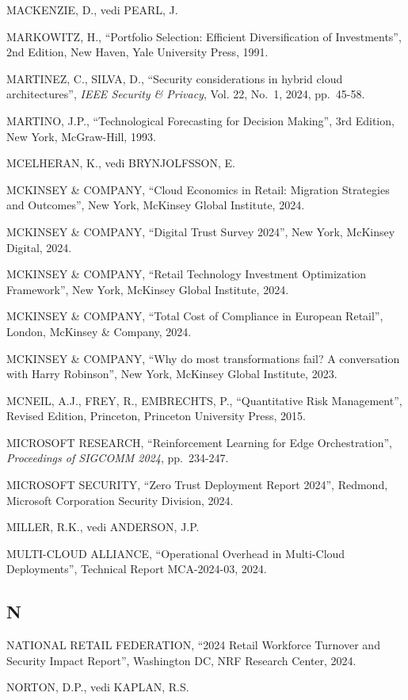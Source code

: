 \documentclass{report}
\begin{document}
MACKENZIE, D., vedi PEARL, J.

MARKOWITZ, H., ``Portfolio Selection: Efficient Diversification of
Investments'', 2nd Edition, New Haven, Yale University Press, 1991.

MARTINEZ, C., SILVA, D., ``Security considerations in hybrid cloud
architectures'', \emph{IEEE Security \& Privacy}, Vol. 22, No.~1, 2024,
pp.~45-58.

MARTINO, J.P., ``Technological Forecasting for Decision Making'', 3rd
Edition, New York, McGraw-Hill, 1993.

MCELHERAN, K., vedi BRYNJOLFSSON, E.

MCKINSEY \& COMPANY, ``Cloud Economics in Retail: Migration Strategies
and Outcomes'', New York, McKinsey Global Institute, 2024.

MCKINSEY \& COMPANY, ``Digital Trust Survey 2024'', New York, McKinsey
Digital, 2024.

MCKINSEY \& COMPANY, ``Retail Technology Investment Optimization
Framework'', New York, McKinsey Global Institute, 2024.

MCKINSEY \& COMPANY, ``Total Cost of Compliance in European Retail'',
London, McKinsey \& Company, 2024.

MCKINSEY \& COMPANY, ``Why do most transformations fail? A conversation
with Harry Robinson'', New York, McKinsey Global Institute, 2023.

MCNEIL, A.J., FREY, R., EMBRECHTS, P., ``Quantitative Risk Management'',
Revised Edition, Princeton, Princeton University Press, 2015.

MICROSOFT RESEARCH, ``Reinforcement Learning for Edge Orchestration'',
\emph{Proceedings of SIGCOMM 2024}, pp.~234-247.

MICROSOFT SECURITY, ``Zero Trust Deployment Report 2024'', Redmond,
Microsoft Corporation Security Division, 2024.

MILLER, R.K., vedi ANDERSON, J.P.

MULTI-CLOUD ALLIANCE, ``Operational Overhead in Multi-Cloud
Deployments'', Technical Report MCA-2024-03, 2024.

\subsection{N}\label{n-1}

NATIONAL RETAIL FEDERATION, ``2024 Retail Workforce Turnover and
Security Impact Report'', Washington DC, NRF Research Center, 2024.

NORTON, D.P., vedi KAPLAN, R.S.
\end{document}
